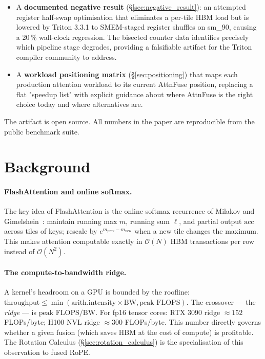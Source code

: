\documentclass[10pt,twocolumn]{article}
\begin{document}
\begin{itemize}[leftmargin=1.2em,itemsep=2pt]
  \item A \textbf{documented negative result}
        (\S\ref{sec:negative_result}): an attempted register
        half-swap optimisation that eliminates a per-tile HBM load
        but is lowered by Triton 3.3.1 to SMEM-staged register
        shuffles on sm\_90, causing a 20\,\% wall-clock regression.
        The bisected counter data identifies precisely which
        pipeline stage degrades, providing a falsifiable artifact
        for the Triton compiler community to address.

  \item A \textbf{workload positioning matrix}
        (\S\ref{sec:positioning}) that maps each production attention
        workload to its current AttnFuse position, replacing a flat
        "speedup list" with explicit guidance about where AttnFuse
        is the right choice today and where alternatives are.
\end{itemize}

The artifact is open source. All numbers in the paper are
reproducible from the public benchmark suite.

\section{Background}
\label{sec:background}

\paragraph{FlashAttention and online softmax.}
The key idea of FlashAttention is the online softmax recurrence of
Milakov and Gimelshein~\cite{milakov2018online}: maintain running
max $m$, running sum $\ell$, and partial output $\text{acc}$ across
tiles of keys; rescale by $e^{m_\text{prev} - m_\text{new}}$ when a
new tile changes the maximum. This makes attention computable
exactly in $\mathcal{O}(N)$ HBM transactions per row instead of
$\mathcal{O}(N^2)$.

\paragraph{The compute-to-bandwidth ridge.}
A kernel's headroom on a GPU is bounded by the roofline:
$\text{throughput} \leq \min(\text{arith.intensity}\times\text{BW},
\text{peak FLOPS})$. The crossover --- the \emph{ridge} --- is
$\text{peak FLOPS} / \text{BW}$. For fp16 tensor cores: RTX 3090
ridge $\approx 152$ FLOPs/byte; H100 NVL ridge $\approx 300$
FLOPs/byte. This number directly governs whether a given fusion
(which saves HBM at the cost of compute) is profitable. The
Rotation Calculus (\S\ref{sec:rotation_calculus}) is the
specialisation of this observation to fused RoPE.
\end{document}
